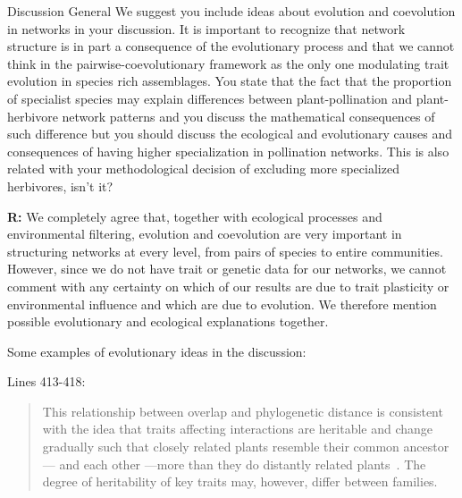 \documentclass[12pt]{letter}
\newenvironment{refquote}{\bigskip \begin{it}}{\end{it}\smallskip}
\begin{document}
		\begin{refquote}
			Discussion
			General
			We suggest you include ideas about evolution and coevolution in networks in your discussion. It is important to recognize that network structure is in part a consequence of the evolutionary process and that we cannot think in the pairwise-coevolutionary framework as the only one modulating trait evolution in species rich assemblages.
			You state that the fact that the proportion of specialist species may explain differences between plant-pollination and plant-herbivore network patterns and you discuss the mathematical consequences of such difference but you should discuss the ecological and evolutionary causes and consequences of having higher specialization in pollination networks. This is also related with your methodological decision of excluding more specialized herbivores, isn't it?
		\end{refquote}


		\textbf{R:} %
		We completely agree that, together with ecological processes and environmental filtering, evolution and coevolution are very important in structuring networks at every level, from pairs of species to entire communities. However, since we do not have trait or genetic data for our networks, we cannot comment with any certainty on which of our results are due to trait plasticity or environmental influence and which are due to evolution. We therefore mention possible evolutionary and ecological explanations together.


		Some examples of evolutionary ideas in the discussion:


		Lines 413-418:

		\begin{quotation}

			This relationship between overlap and 
			phylogenetic distance is consistent with the idea that traits affecting 
			interactions are heritable and change gradually
			such that closely related plants resemble their common ancestor--- and
			each other ---more than they do distantly related 
			plants~\citep{Schemske1999,Gilbert2015,Ponisio2017}. The degree of 
			heritability of key traits may, however, differ between families.

		\end{quotation}
\end{document}
